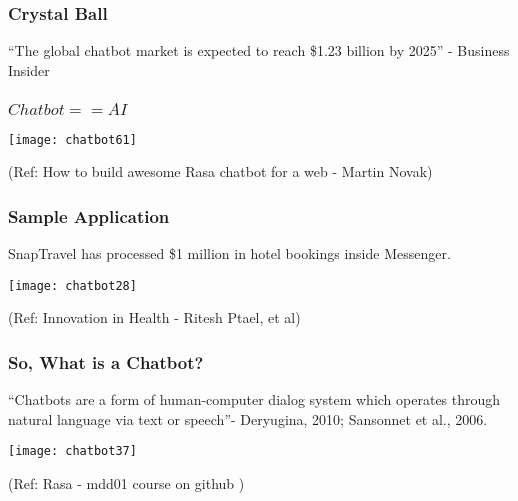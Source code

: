 \begin{frame}[fragile]\frametitle{Crystal Ball}



``The global chatbot market is expected to reach \$1.23 billion by 2025'' - Business Insider

\end{frame}

\begin{frame}[fragile]\frametitle{$Chatbot == AI$}


\begin{center}
\texttt{[image: chatbot61]}
\end{center}

{\tiny (Ref: How to build awesome Rasa chatbot for a web - Martin Novak)}


\end{frame}


\begin{frame}[fragile]\frametitle{Sample Application}

SnapTravel has processed \$1 million in hotel bookings inside Messenger.


\begin{center}
\texttt{[image: chatbot28]}
\end{center}

{\tiny (Ref: Innovation in Health - Ritesh Ptael, et al)}


\end{frame}



\begin{frame}[fragile]\frametitle{So, What is a Chatbot?}

``Chatbots are a form of human-computer dialog system which operates 
through natural language via text or speech''- Deryugina, 2010; Sansonnet et al., 2006.

\begin{center}
\texttt{[image: chatbot37]}

{\tiny (Ref: Rasa - mdd01 course on github )}

\end{center}

\end{frame}


